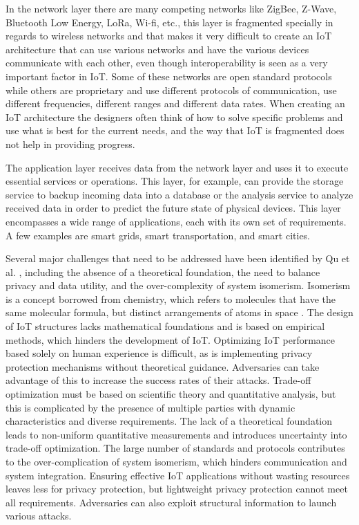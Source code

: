 In the network layer there are many competing networks like ZigBee, Z-Wave,
Bluetooth Low Energy, LoRa, Wi-fi, etc., this layer is fragmented specially
in regards to wireless networks and that makes it very difficult to create
an IoT architecture that can use various networks and have the various
devices communicate with each other, even though interoperability is seen
as a very important factor in IoT. Some of these networks are open standard
protocols while others are proprietary and use different protocols of communication,
use different frequencies, different ranges and different data rates. When
creating an IoT architecture the designers often think of how to solve
specific problems and use what is best for the current needs, and the way
that IoT is fragmented does not help in providing progress.

The application layer receives data from the network layer and uses it to
execute essential services or operations. This layer, for example, can provide
the storage service to backup incoming data into a database or the analysis
service to analyze received data in order to predict the future state of
physical devices. This layer encompasses a wide range of applications, each
with its own set of requirements. A few examples are smart grids, smart
transportation, and smart cities.

Several major challenges that need to be addressed have been identified by
Qu et al. \cite{Qu2018Privacy}, including the absence of a theoretical foundation,
the need to balance privacy and data utility, and the over-complexity of system
isomerism. Isomerism is a concept borrowed from chemistry, which refers to
molecules that have the same molecular formula, but distinct arrangements of
atoms in space \cite{petrucci2023general}. The design of IoT structures lacks
mathematical foundations and is based on empirical methods, which hinders
the development of IoT. Optimizing IoT performance based solely on human experience
is difficult, as is implementing privacy protection mechanisms without theoretical
guidance. Adversaries can take advantage of this to increase the success rates
of their attacks. Trade-off optimization must be based on scientific theory
and quantitative analysis, but this is complicated by the presence of multiple
parties with dynamic characteristics and diverse requirements. The lack of a
theoretical foundation leads to non-uniform quantitative measurements and introduces
uncertainty into trade-off optimization. The large number of standards and protocols
contributes to the over-complication of system isomerism, which hinders communication
and system integration. Ensuring effective IoT applications without wasting resources
leaves less for privacy protection, but lightweight privacy protection cannot
meet all requirements. Adversaries can also exploit structural information to
launch various attacks.

